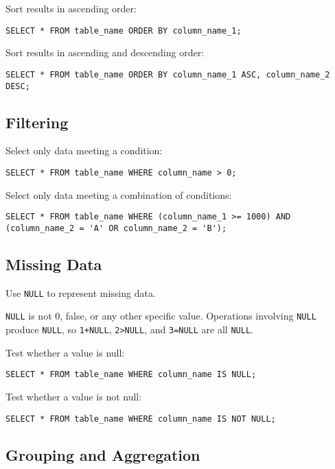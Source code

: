 Sort results in ascending order:

\begin{Verbatim}
SELECT * FROM table_name ORDER BY column_name_1;
\end{Verbatim}

Sort results in ascending and descending order:

\begin{Verbatim}
SELECT * FROM table_name ORDER BY column_name_1 ASC, column_name_2 DESC;
\end{Verbatim}

\subsection*{Filtering}

Select only data meeting a condition:

\begin{Verbatim}
SELECT * FROM table_name WHERE column_name > 0;
\end{Verbatim}

Select only data meeting a combination of conditions:

\begin{Verbatim}
SELECT * FROM table_name WHERE (column_name_1 >= 1000) AND (column_name_2 = 'A' OR column_name_2 = 'B');
\end{Verbatim}

\subsection*{Missing Data}

Use \texttt{NULL} to represent missing data.

\texttt{NULL} is not 0, false, or any other specific value. Operations
involving \texttt{NULL} produce \texttt{NULL}, so \texttt{1+NULL},
\texttt{2\textgreater{}NULL}, and \texttt{3=NULL} are all \texttt{NULL}.

Test whether a value is null:

\begin{Verbatim}
SELECT * FROM table_name WHERE column_name IS NULL;
\end{Verbatim}

Test whether a value is not null:

\begin{Verbatim}
SELECT * FROM table_name WHERE column_name IS NOT NULL;
\end{Verbatim}

\subsection*{Grouping and Aggregation}

